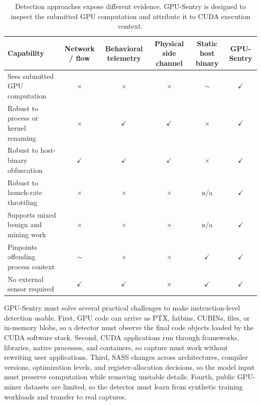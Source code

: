 \begin{table}[t]
    \centering
    \caption{Detection approaches expose different evidence. GPU-Sentry is designed to inspect the submitted GPU computation and attribute it to CUDA execution context.}
    \label{tab:feature_comparison}
    \footnotesize
    \begin{tabular}{lccccc}
        \toprule
        Capability & Network / flow & Behavioral telemetry & Physical side channel & Static host binary & \textbf{GPU-Sentry} \\
        \midrule
        Sees submitted GPU computation & $\times$ & $\times$ & $\times$ & $\sim$ & \textbf{$\checkmark$} \\
        Robust to process or kernel renaming & $\times$ & $\checkmark$ & $\checkmark$ & $\times$ & \textbf{$\checkmark$} \\
        Robust to host-binary obfuscation & $\checkmark$ & $\checkmark$ & $\checkmark$ & $\times$ & \textbf{$\checkmark$} \\
        Robust to launch-rate throttling & $\times$ & $\times$ & $\times$ & n/a & \textbf{$\checkmark$} \\
        Supports mixed benign and mining work & $\times$ & $\times$ & $\times$ & n/a & \textbf{$\checkmark$} \\
        Pinpoints offending process context & $\sim$ & $\times$ & $\times$ & $\checkmark$ & \textbf{$\checkmark$} \\
        No external sensor required & $\checkmark$ & $\checkmark$ & $\times$ & $\checkmark$ & \textbf{$\checkmark$} \\
        \bottomrule
    \end{tabular}
\end{table}

GPU-Sentry must solve several practical challenges to make instruction-level detection usable. First, GPU code can arrive as PTX, fatbins, CUBINs, files, or in-memory blobs, so a detector must observe the final code objects loaded by the CUDA software stack. Second, CUDA applications run through frameworks, libraries, native processes, and containers, so capture must work without rewriting user applications. Third, SASS changes across architectures, compiler versions, optimization levels, and register-allocation decisions, so the model input must preserve computation while removing unstable details. Fourth, public GPU-miner datasets are limited, so the detector must learn from synthetic training workloads and transfer to real captures.

